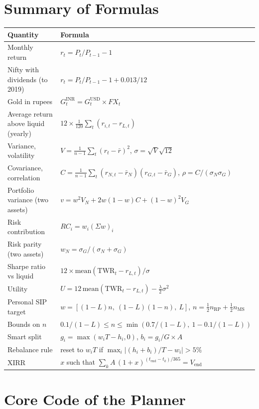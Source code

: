 \chapter{Summary of Formulas}
\label{app:formulas}

\begin{table}[H]
\centering
\small
\begin{tabularx}{\textwidth}{@{}lX@{}}
\toprule
Quantity & Formula \\
\midrule
Monthly return & $r_t = P_t / P_{t-1} - 1$ \\
Nifty with dividends (to 2019) & $r_t = P_t/P_{t-1} - 1 + 0.013/12$ \\
Gold in rupees & $G^{\text{INR}}_t = G^{\text{USD}}_t \times FX_t$ \\
Average return above liquid (yearly) & $12 \times \frac{1}{120}\sum_t (r_{i,t} - r_{L,t})$ \\
Variance, volatility & $V = \frac{1}{n-1}\sum_t (r_t - \bar r)^2$, \quad $\sigma = \sqrt{V}\sqrt{12}$ \\
Covariance, correlation & $C = \frac{1}{n-1}\sum_t (r_{N,t}-\bar r_N)(r_{G,t}-\bar r_G)$, \quad $\rho = C/(\sigma_N\sigma_G)$ \\
Portfolio variance (two assets) & $v = w^2V_N + 2w(1-w)C + (1-w)^2V_G$ \\
Risk contribution & $RC_i = w_i(\Sigma w)_i$ \\
Risk parity (two assets) & $w_N = \sigma_G / (\sigma_N + \sigma_G)$ \\
Sharpe ratio vs liquid & $12 \times \text{mean}(\text{TWR}_t - r_{L,t}) / \sigma$ \\
Utility & $U = 12\,\text{mean}(\text{TWR}_t - r_{L,t}) - \frac{\lambda}{2}\sigma^2$ \\
Personal SIP target & $w = [(1-L)n,\ (1-L)(1-n),\ L]$, \quad $n = \frac12 n_{\text{RP}} + \frac12 n_{\text{MS}}$ \\
Bounds on $n$ & $0.1/(1-L) \le n \le \min(0.7/(1-L),\ 1 - 0.1/(1-L))$ \\
Smart split & $g_i = \max(w_iT - h_i, 0)$, \quad $b_i = g_i/G \times A$ \\
Rebalance rule & reset to $w_i T$ if $\max_i |(h_i+b_i)/T - w_i| > 5\%$ \\
XIRR & $x$ such that $\sum_k A\,(1+x)^{(t_{\text{end}}-t_k)/365} = V_{\text{end}}$ \\
\bottomrule
\end{tabularx}
\end{table}

\chapter{Core Code of the Planner}
\label{app:code}

